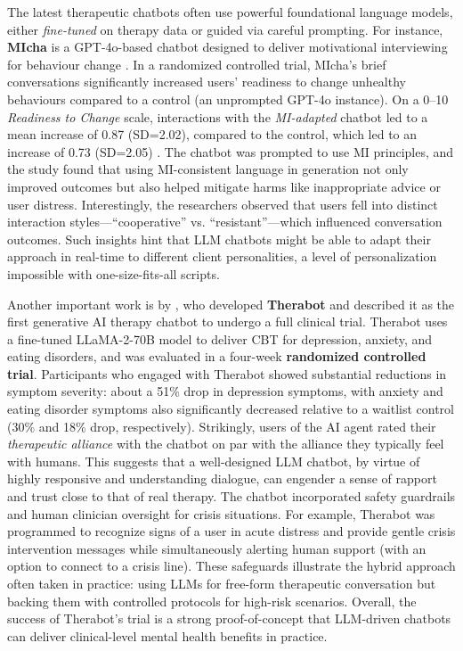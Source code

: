 The latest therapeutic chatbots often use powerful foundational language models, either \emph{fine-tuned} on therapy data or guided via careful prompting. For instance, \textbf{MIcha} is a GPT-4o-based chatbot designed to deliver motivational interviewing for behaviour change \cite{Meyer2025}. In a randomized controlled trial, MIcha's brief conversations significantly increased users' readiness to change unhealthy behaviours compared to a control (an unprompted GPT-4o instance). On a 0--10 \emph{Readiness to Change} \cite{BienerAbrams1991} scale, interactions with the \emph{MI-adapted} chatbot led to a mean increase of 0.87 (SD=2.02), compared to the control, which led to an increase of 0.73 (SD=2.05) \cite{Meyer2025}.
The chatbot was prompted to use MI principles, and the study found that using MI-consistent language in generation not only improved outcomes but also helped mitigate harms like inappropriate advice or user distress. Interestingly, the researchers observed that users fell into distinct interaction styles---``cooperative'' vs. ``resistant''---which influenced conversation outcomes. Such insights hint that LLM chatbots might be able to adapt their approach in real-time to different client personalities, a level of personalization impossible with one-size-fits-all scripts.

Another important work is by \citet{doi:10.1056/AIoa2400802}, who developed \textbf{Therabot} and described it as the first generative AI therapy chatbot to undergo a full clinical trial. Therabot uses a fine-tuned LLaMA-2-70B model to deliver CBT for depression, anxiety, and eating disorders, and was evaluated in a four-week \textbf{randomized controlled trial}. Participants who engaged with Therabot showed substantial reductions in symptom severity: about a 51\% drop in depression symptoms, with anxiety and eating disorder symptoms also significantly decreased relative to a waitlist control (30\% and 18\% drop, respectively). Strikingly, users of the AI agent rated their \emph{therapeutic alliance} with the chatbot on par with the alliance they typically feel with humans. This suggests that a well-designed LLM chatbot, by virtue of highly responsive and understanding dialogue, can engender a sense of rapport and trust close to that of real therapy. The chatbot incorporated safety guardrails and human clinician oversight for crisis situations. For example, Therabot was programmed to recognize signs of a user in acute distress and provide gentle crisis intervention messages while simultaneously alerting human support (with an option to connect to a crisis line). These safeguards illustrate the hybrid approach often taken in practice: using LLMs for free-form therapeutic conversation but backing them with controlled protocols for high-risk scenarios. Overall, the success of Therabot’s trial is a strong proof-of-concept that LLM-driven chatbots can deliver clinical-level mental health benefits in practice.

